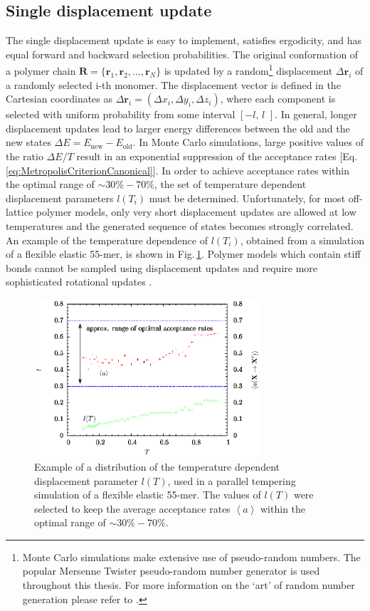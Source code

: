 \documentclass[12pt]{report}
\begin{document}
\subsection{Single displacement update}
The single displacement update is easy to implement, satisfies ergodicity, and has equal forward and backward selection probabilities. The original conformation of a polymer chain $\mathbf{R} = \{\mathbf{r}_{1},\mathbf{r}_{2},...,\mathbf{r}_{N}\}$ is updated by a random\footnote{Monte Carlo simulations make extensive use of pseudo-random numbers. The popular Mersenne Twister pseudo-random number generator \cite{Matsumoto1998} is used throughout this thesis. For more information on the `art' of random number generation please refer to \cite{Landau2000}.} displacement $\Delta \mathbf{r}_{i}$ of a randomly selected i-th monomer. The displacement vector is defined in the Cartesian coordinates as $\Delta \mathbf{r}_{i} = (\Delta x_{i}, \Delta y_{i}, \Delta z_{i})$, where each component is selected with uniform probability from some interval $[-l,\,l\,\,]$. In general, longer displacement updates lead to larger energy differences between the old and the new states $\Delta E = E_{\mathrm{new}} - E_{\mathrm{old}}$. In Monte Carlo simulations, large positive values of the ratio $\Delta E/T$ result in an exponential suppression of the acceptance rates [Eq. \ref{eq:MetropolisCriterionCanonical}]. In order to achieve acceptance rates within the optimal range of $\sim 30\%-70\%$, the set of temperature dependent displacement parameters $l(T_{i})$ must be determined. Unfortunately, for most off-lattice polymer models, only very short displacement updates are allowed at low temperatures and the generated sequence of states becomes strongly correlated. An example of the temperature dependence of $l(T_{i})$, obtained from a simulation of a flexible elastic 55-mer, is shown in Fig.\,\ref{fig:acceptanceRates}. Polymer models which contain stiff bonds cannot be sampled using displacement updates and require more sophisticated rotational updates \cite{Bachmann2014}.
%
\begin{figure}
\center
\includegraphics[width = 0.75\textwidth]{chapter3Figs/acceptanceRates.eps}
\caption{\label{fig:acceptanceRates}%
Example of a distribution of the temperature dependent displacement parameter $l(T)$, used in a parallel tempering simulation of a flexible elastic 55-mer. The values of $l(T)$ were selected to keep the average acceptance rates $\left\langle a \right\rangle$ within the optimal range of $\sim 30\%-70\%$.
}
\end{figure}
% 
\end{document}
